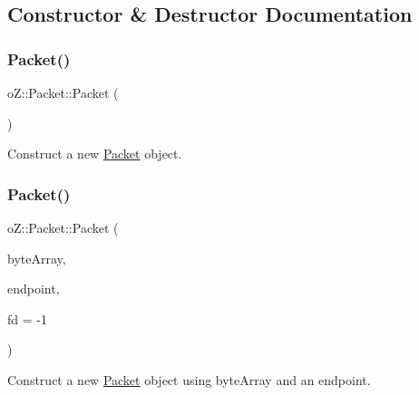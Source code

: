 \subsection{Constructor \& Destructor Documentation}
\mbox{\label{classo_z_1_1_packet_a5c96f8d5db686e035b199e8aeb0e0cea}} 
\subsubsection{\texorpdfstring{Packet()}{Packet()}\hspace{0.1cm}{\footnotesize\ttfamily [1/2]}}
{\footnotesize\ttfamily o\+Z\+::\+Packet\+::\+Packet (\begin{DoxyParamCaption}\item[{void}]{ }\end{DoxyParamCaption})\hspace{0.3cm}{\ttfamily [default]}}



Construct a new \mbox{\hyperlink{classo_z_1_1_packet}{Packet}} object. 

\mbox{\label{classo_z_1_1_packet_a4affbe387050c6b67f4604f9eaadc074}} 
\subsubsection{\texorpdfstring{Packet()}{Packet()}\hspace{0.1cm}{\footnotesize\ttfamily [2/2]}}
{\footnotesize\ttfamily o\+Z\+::\+Packet\+::\+Packet (\begin{DoxyParamCaption}\item[{\mbox{\hyperlink{namespaceo_z_abfa3f5a46e5c7584615dc1dd33fcafb6}{Byte\+Array}} \&\&}]{byte\+Array,  }\item[{const \mbox{\hyperlink{classo_z_1_1_endpoint}{Endpoint}}}]{endpoint,  }\item[{const \mbox{\hyperlink{namespaceo_z_acbb8d05709257b6414b3979597f88c0c}{File\+Descriptor}}}]{fd = {\ttfamily -\/1} }\end{DoxyParamCaption})\hspace{0.3cm}{\ttfamily [inline]}}



Construct a new \mbox{\hyperlink{classo_z_1_1_packet}{Packet}} object using byte\+Array and an endpoint. 

